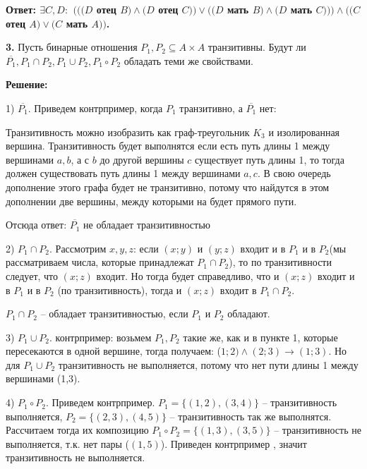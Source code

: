 \documentclass[a4paper,12pt]{article} %
\begin{document}
\begin{flushright}
\begin{large}
\textbf {Ответ: $\exists C,D:$ $(((D$ отец $B) \wedge (D$ отец $C)) \vee ((D$ мать $B) \wedge (D$ мать $C))) \wedge ((C$ отец $A) \vee (C$ мать $A))$. }
\end{large}
\end{flushright}

{\bf 3.} Пусть бинарные отношения $P_1,P_2 \subseteq A \times A$ транзитивны. Будут ли $\overline{P_1}, P_1 \cap P_2, P_1 \cup P_2, P_1 \circ P_2$ обладать теми же свойствами. 
\begin{center}
\bfseries
{\Large Решение: }
\end{center}

1) $\overline{P_1}$. Приведем контрпример, когда $P_1$ транзитивно, а $\overline{P_1}$ нет:

Транзитивность можно изобразить как граф-треугольник $K_3$ и изолированная вершина. Транзитивность будет выполнятся если есть путь длины 1 между вершинами $a,b$, а с $ b $ до другой вершины $c$ существует путь длины 1, то тогда должен существовать путь длины 1 между вершинами $a,c$. В свою очередь дополнение этого графа будет не транзитивно, потому что найдутся в этом дополнении две вершины, между которыми на будет прямого пути.

Отсюда ответ: $\overline{P_1}$ не обладает транзитивностью

2) $P_1 \cap P_2$. Рассмотрим $x,y,z$: если $(x;y)$ и $(y;z)$ входит и в $P_1$ и в $P_2$(мы рассматриваем числа, которые принадлежат $P_1 \cap P_2$), то по транзитивности следует, что $(x;z)$ входит. Но тогда будет справедливо, что и $(x;z)$ входит и в $P_1$ и в $P_2$ (по транзитивность), тогда и $(x;z)$ входит в $P_1 \cap P_2$. 

$P_1 \cap P_2$ -- обладает транзитивностью, если $P_1$ и $P_2$ обладают.

3) $P_1 \cup P_2$. контрпример: возьмем $P_1,P_2$ такие же, как и в пункте 1, которые пересекаются в одной вершине, тогда получаем: ($1;2) \wedge (2;3) \rightarrow (1;3)$. Но для $P_1 \cup P_2$ транзитивность не выполняется, потому что нет пути длины 1 между вершинами (1,3).

4) $P_1 \circ P_2$. Приведем контрпример. $P_1 = \{(1,2),(3,4)\}$ -- транзитивность выполняется, $P_2 = \{(2,3),(4,5)\}$ -- транзитивность так же выполнятся. Рассчитаем тогда их композицию $P_1 \circ P_2 = \{(1,3),(3,5) \}$ -- транзитивность не выполняется, т.к. нет пары ($(1,5)$). Приведен контрпример , значит транзитивность не выполняется.
\end{document}
